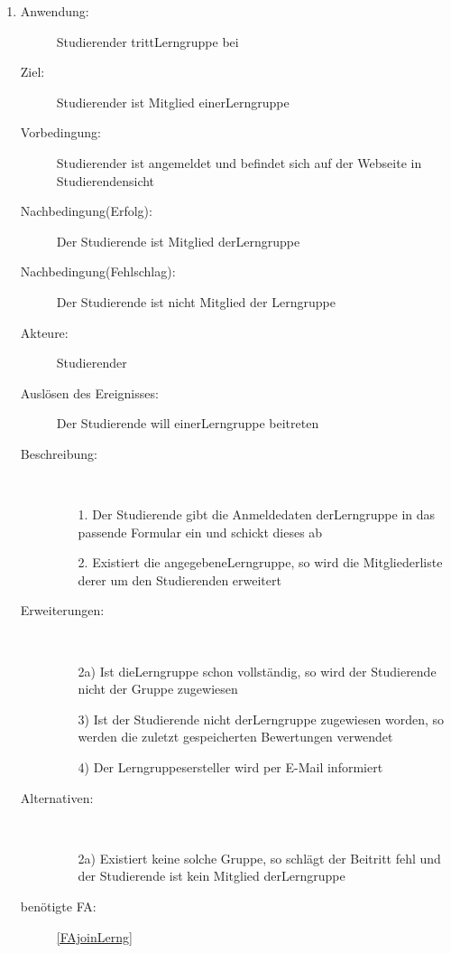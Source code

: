 \documentclass[parskip=full]{scrartcl}
\newcommand{\swtLabel}[1]{\textbf{/#1\arabic*0/}}
\begin{document}
\begin{enumerate}[label=\swtLabel{S}]
  
  \item
  \begin{description}
  \item[Anwendung:] Studierender tritt\gls{Lerngruppe} bei
  \item[Ziel:] Studierender ist Mitglied einer\gls{Lerngruppe}
  	\item[Vorbedingung:] Studierender ist angemeldet und befindet sich auf der
  	Webseite in Studierendensicht
  	\item[Nachbedingung(Erfolg):] Der Studierende ist Mitglied der\gls{Lerngruppe}
  	\item[Nachbedingung(Fehlschlag):] Der Studierende ist nicht Mitglied der
  	Lerngruppe
  	\item[Akteure:] Studierender
  	\item[Auslösen des Ereignisses:] Der Studierende will einer\gls{Lerngruppe} beitreten
  	\item[Beschreibung:]~
  	\begin{enumerate}
  	  \item[1.] Der Studierende gibt die Anmeldedaten der\gls{Lerngruppe} in das
  	  passende Formular ein und schickt dieses ab %
  	  \item[2.] Existiert die angegebene\gls{Lerngruppe}, so wird die Mitgliederliste
  	  derer um den Studierenden erweitert
  	\end{enumerate}
  	\item[Erweiterungen:]~
  	\begin{enumerate}
  	  \item[2a)] Ist die\gls{Lerngruppe} schon vollständig, so wird der Studierende nicht
  	  der Gruppe zugewiesen
  	  \item[3)] Ist der Studierende nicht der\gls{Lerngruppe} zugewiesen worden, so werden
  	  die zuletzt gespeicherten Bewertungen verwendet
  	  \item[4)] Der \glspl{Lerngruppe}ersteller wird per E-Mail informiert
  	 \end{enumerate}
  	\item[Alternativen:] ~
  	\begin{enumerate}
  	  \item[2a)] Existiert keine solche Gruppe, so schlägt der Beitritt fehl und
  	  der Studierende ist kein Mitglied der\gls{Lerngruppe}
  	 \end{enumerate}
  	 \item[benötigte FA:] \ref{FAjoinLerng}
  \end{description}
  

\end{enumerate}
\end{document}
